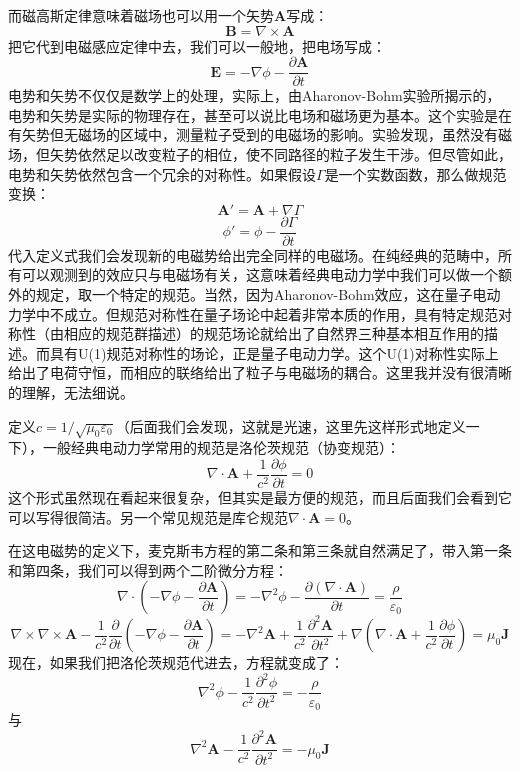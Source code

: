 \documentclass{ctexart}
\begin{document}
而磁高斯定律意味着磁场也可以用一个矢势$\bm{A}$写成：
\begin{equation}
\bm{B}=\nabla\times\bm{A}
\end{equation}
把它代到电磁感应定律中去，我们可以一般地，把电场写成：
\begin{equation}
\bm{E}=-\nabla\phi-\frac{\partial\bm{A}}{\partial t}
\end{equation}
电势和矢势不仅仅是数学上的处理，实际上，由Aharonov-Bohm实验所揭示的，电势和矢势是实际的物理存在，甚至可以说比电场和磁场更为基本。这个实验是在有矢势但无磁场的区域中，测量粒子受到的电磁场的影响。实验发现，虽然没有磁场，但矢势依然足以改变粒子的相位，使不同路径的粒子发生干涉。但尽管如此，电势和矢势依然包含一个冗余的对称性。如果假设$\Gamma$是一个实数函数，那么做规范变换：
\begin{equation}
\bm{A'}=\bm{A}+\nabla\Gamma
\end{equation}
\begin{equation}
\phi'=\phi-\frac{\partial\Gamma}{\partial t}
\end{equation}
代入定义式我们会发现新的电磁势给出完全同样的电磁场。在纯经典的范畴中，所有可以观测到的效应只与电磁场有关，这意味着经典电动力学中我们可以做一个额外的规定，取一个特定的规范。当然，因为Aharonov-Bohm效应，这在量子电动力学中不成立。但规范对称性在量子场论中起着非常本质的作用，具有特定规范对称性（由相应的规范群描述）的规范场论就给出了自然界三种基本相互作用的描述。而具有U(1)规范对称性的场论，正是量子电动力学。这个U(1)对称性实际上给出了电荷守恒，而相应的联络给出了粒子与电磁场的耦合。这里我并没有很清晰的理解，无法细说。

定义$c=1/\sqrt{\mu_0\varepsilon_0}$（后面我们会发现，这就是光速，这里先这样形式地定义一下），一般经典电动力学常用的规范是洛伦茨规范（协变规范）：
\begin{equation}
\nabla\cdot\bm{A}+\frac{1}{c^2}\frac{\partial \phi}{\partial t}=0
\end{equation}
这个形式虽然现在看起来很复杂，但其实是最方便的规范，而且后面我们会看到它可以写得很简洁。另一个常见规范是库仑规范$\nabla\cdot\bm{A}=0$。

在这电磁势的定义下，麦克斯韦方程的第二条和第三条就自然满足了，带入第一条和第四条，我们可以得到两个二阶微分方程：
\begin{equation}
\nabla\cdot(-\nabla\phi-\frac{\partial\bm{A}}{\partial t})=-\nabla^2\phi-\frac{\partial(\nabla\cdot\bm{A})}{\partial t}=\frac{\rho}{\varepsilon_0}
\end{equation}
\begin{equation}
\nabla\times\nabla\times\bm{A}-\frac{1}{c^2}\frac{\partial}{\partial t}(-\nabla\phi-\frac{\partial\bm{A}}{\partial t})=-\nabla^2\bm{A}+\frac{1}{c^2}\frac{\partial^2\bm{A}}{\partial t^2}+\nabla(\nabla\cdot\bm{A}+\frac{1}{c^2}\frac{\partial\phi}{\partial t})=\mu_0\bm{J}
\end{equation}
现在，如果我们把洛伦茨规范代进去，方程就变成了：
\begin{equation}
\nabla^2\phi-\frac{1}{c^2}\frac{\partial^2\phi}{\partial t^2}=-\frac{\rho}{\varepsilon_0}
\end{equation}
与
\begin{equation}
\nabla^2\bm{A}-\frac{1}{c^2}\frac{\partial^2\bm{A}}{\partial t^2}=-\mu_0\bm{J}
\end{equation}
\end{document}

